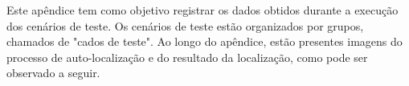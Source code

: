 
Este apêndice tem como objetivo registrar os dados obtidos durante a execução dos cenários de teste. Os cenários de teste estão organizados
por grupos, chamados de "cados de teste". Ao longo do apêndice, estão presentes imagens do processo de auto-localização e do resultado da localização, como pode ser observado a seguir.











